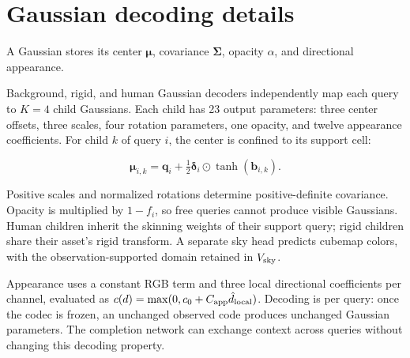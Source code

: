 \section{Gaussian decoding details}
\label{sec:supp-codec}

A Gaussian stores its center $\boldsymbol\mu$, covariance $\boldsymbol\Sigma$, opacity $\alpha$, and directional appearance.

Background, rigid, and human Gaussian decoders independently map each query to $K=4$ child Gaussians. Each child has 23 output parameters: three center offsets, three scales, four rotation parameters, one opacity, and twelve appearance coefficients. For child $k$ of query $i$, the center is confined to its support cell:

\begin{equation}
\boldsymbol\mu_{i,k}=\mathbf q_i+
\tfrac12\boldsymbol\delta_i\odot\tanh(\mathbf b_{i,k}).
\label{eq:child-center}
\end{equation}

Positive scales and normalized rotations determine positive-definite covariance. Opacity is multiplied by $1-f_i$, so free queries cannot produce visible Gaussians. Human children inherit the skinning weights of their support query; rigid children share their asset's rigid transform. A separate sky head predicts cubemap colors, with the observation-supported domain retained in $V_{\rm sky}$.

Appearance uses a constant RGB term and three local directional coefficients per channel, evaluated as $c(d)=\max(0,c_0+C_{\rm app}\hat d_{\rm local})$. Decoding is per query: once the codec is frozen, an unchanged observed code produces unchanged Gaussian parameters. The completion network can exchange context across queries without changing this decoding property.
